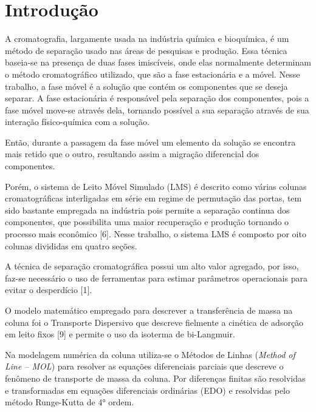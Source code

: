 \documentclass[por]{Template_SBEF}
\begin{document}
\maketitle
\thispagestyle{fancy}
\printcontactdata



\section{Introdução}

A cromatografia, largamente usada na indústria química e bioquímica, é um método de separação usado nas áreas de pesquisas e produção. Essa técnica baseia-se na presença de duas fases imiscíveis, onde elas normalmente determinam o método cromatográfico utilizado, que são a fase estacionária e a móvel. Nesse trabalho, a fase móvel é a solução que contém os componentes que se deseja separar. A fase estacionária é responsável pela separação dos componentes, pois a fase móvel move-se através dela, tornando possível a sua separação através de sua interação físico-química com a solução. 

Então, durante a passagem da fase móvel um elemento da solução se encontra mais retido que o outro, resultando assim a migração diferencial dos componentes.

Porém, o sistema de Leito Móvel Simulado (LMS) é descrito como várias colunas cromatográficas interligadas em série em regime de permutação das portas, tem sido bastante empregada na indústria pois permite a separação continua dos componentes, que possibilita uma maior recuperação e produção tornando o processo mais econômico [6]. Nesse trabalho, o sistema LMS é composto por oito colunas divididas em quatro seções.

A técnica de separação cromatográfica possui um alto valor agregado, por isso, faz-se necessário o uso de ferramentas para estimar parâmetros operacionais para evitar o desperdício [1].

O modelo matemático empregado para descrever a transferência de massa na coluna foi o Transporte Dispersivo que descreve fielmente a cinética de adsorção em leito fixos [9] e permite o uso da isoterma de bi-Langmuir.

Na modelagem numérica da coluna utiliza-se o Métodos de Linhas (\textit{Method of Line – MOL}) para resolver as equações diferenciais parciais que descreve o fenômeno de transporte de massa da coluna. Por diferenças finitas são resolvidas e transformadas em equações diferenciais ordinárias (EDO) e resolvidas pelo método Runge-Kutta de 4° ordem.
\end{document}

